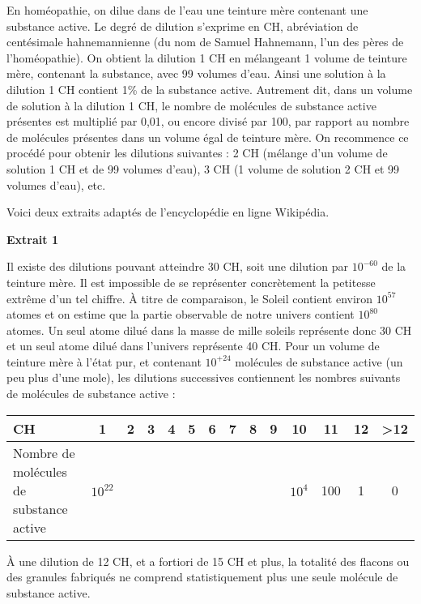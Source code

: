 
En homéopathie, on dilue dans de l’eau une teinture mère contenant une substance active. Le degré de dilution s’exprime en CH, abréviation de centésimale hahnemannienne (du nom de Samuel Hahnemann, l’un des pères de l’homéopathie).
\vspace{0.2cm}
On obtient la dilution 1 CH en mélangeant 1 volume de teinture mère, contenant la substance, avec 99 volumes d’eau. Ainsi une solution à la dilution 1 CH contient 1\% de la substance active. Autrement dit, dans un volume de solution à la dilution 1 CH, le nombre de molécules de substance active présentes est multiplié par 0,01, ou encore divisé par 100, par rapport au nombre de molécules présentes dans un volume égal de teinture mère.
\vspace{0.2cm}
On recommence ce procédé pour obtenir les dilutions suivantes : 2 CH (mélange d’un volume de solution 1 CH et de 99 volumes d’eau), 3 CH (1 volume de solution 2 CH et 99 volumes d’eau), etc.

\vspace{0.2cm}
Voici deux extraits adaptés de l’encyclopédie en ligne Wikipédia.

\vspace{0.4cm}
\textbf{Extrait 1 }

Il existe des dilutions pouvant atteindre 30 CH, soit une dilution par $10^{-60}$ de la teinture mère. Il est impossible de se représenter concrètement la petitesse extrême d’un tel chiffre. À titre de comparaison, le Soleil contient environ $10^{57}$ atomes et on estime que la partie observable de notre univers contient $10^80$ atomes. Un seul atome dilué dans la masse de mille soleils représente donc 30 CH et un seul atome dilué dans l’univers représente 40 CH. Pour un volume de teinture mère à l’état pur, et contenant $10^{+24}$ molécules de substance active (un peu plus d’une mole), les dilutions successives contiennent les nombres suivants de molécules de substance active :
 
\begin{tabular}{|>{\centering\arraybackslash}p{4cm}|c|c|c|c|c|c|c|c|c|c|c|c|c|}
 \hline 
CH & 1 & 2 & 3 & 4 & 5 & 6 & 7 & 8 & 9 & 10 & 11 & 12 & >12 \\ 
 \hline 
Nombre de molécules de substance active & $10^{22}$ &  & &  &  &  &  &  &  & $10^4$ & 100 & 1 & 0\\ 
 \hline 
 \end{tabular}  

À une dilution de 12 CH, et a fortiori de 15 CH et plus, la totalité des flacons ou des granules 
fabriqués ne comprend statistiquement plus une seule molécule de substance active.

